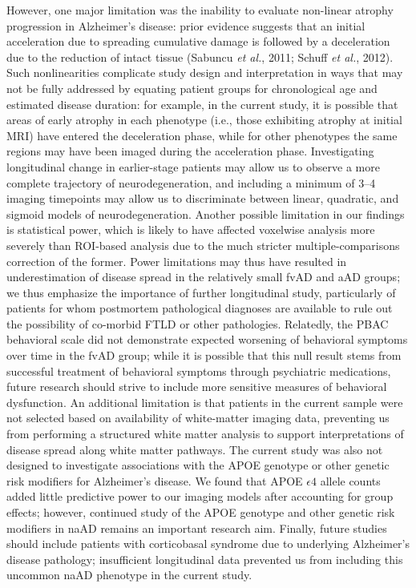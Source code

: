 \documentclass[]{article}
\begin{document}
However, one major limitation was the inability to evaluate non-linear
atrophy progression in Alzheimer's disease: prior evidence suggests that
an initial acceleration due to spreading cumulative damage is followed
by a deceleration due to the reduction of intact tissue (Sabuncu
\emph{et al.}, 2011; Schuff \emph{et al.}, 2012). Such nonlinearities
complicate study design and interpretation in ways that may not be fully
addressed by equating patient groups for chronological age and estimated
disease duration: for example, in the current study, it is possible that
areas of early atrophy in each phenotype (i.e., those exhibiting atrophy
at initial MRI) have entered the deceleration phase, while for other
phenotypes the same regions may have been imaged during the acceleration
phase. Investigating longitudinal change in earlier-stage patients may
allow us to observe a more complete trajectory of neurodegeneration, and
including a minimum of 3--4 imaging timepoints may allow us to
discriminate between linear, quadratic, and sigmoid models of
neurodegeneration. Another possible limitation in our findings is
statistical power, which is likely to have affected voxelwise analysis
more severely than ROI-based analysis due to the much stricter
multiple-comparisons correction of the former. Power limitations may
thus have resulted in underestimation of disease spread in the
relatively small fvAD and aAD groups; we thus emphasize the importance
of further longitudinal study, particularly of patients for whom
postmortem pathological diagnoses are available to rule out the
possibility of co-morbid FTLD or other pathologies. Relatedly, the PBAC
behavioral scale did not demonstrate expected worsening of behavioral
symptoms over time in the fvAD group; while it is possible that this
null result stems from successful treatment of behavioral symptoms
through psychiatric medications, future research should strive to
include more sensitive measures of behavioral dysfunction. An additional
limitation is that patients in the current sample were not selected
based on availability of white-matter imaging data, preventing us from
performing a structured white matter analysis to support interpretations
of disease spread along white matter pathways. The current study was
also not designed to investigate associations with the APOE genotype or
other genetic risk modifiers for Alzheimer's disease. We found that APOE
\(\epsilon4\) allele counts added little predictive power to our imaging
models after accounting for group effects; however, continued study of
the APOE genotype and other genetic risk modifiers in naAD remains an
important research aim. Finally, future studies should include patients
with corticobasal syndrome due to underlying Alzheimer's disease
pathology; insufficient longitudinal data prevented us from including
this uncommon naAD phenotype in the current study.
\end{document}

